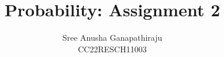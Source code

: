 \documentclass[journal,12pt,twocolumn]{IEEEtran}
\begin{document}
\makeatletter
{}
\makeatother

\let\StandardTheFigure\thefigure
\let\vec\mathbf
\let\j\jmath
\renewcommand{\thefigure}{\theproblem}



\def\putbox#1#2#3{\makebox[0in][l]{\makebox[#1][l]{}\raisebox{\baselineskip}[0in][0in]{\raisebox{#2}[0in][0in]{#3}}}}
     \def\rightbox#1{\makebox[0in][r]{#1}}
     \def\centbox#1{\makebox[0in]{#1}}
     \def\topbox#1{\raisebox{-\baselineskip}[0in][0in]{#1}}
     \def\midbox#1{\raisebox{-0.5\baselineskip}[0in][0in]{#1}}

\vspace{3cm}

\title{
	Probability: Assignment 2
}

\author{
	Sree Anusha Ganapathiraju\\
	CC22RESCH11003
}
\maketitle

\newpage

\tableofcontents

\bigskip

\renewcommand{\thefigure}{\theenumi}
\renewcommand{\thetable}{\theenumi}
%
\end{document}
